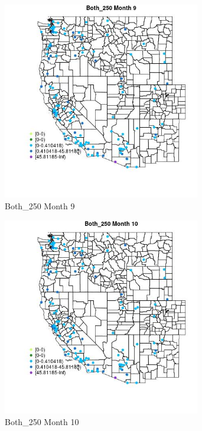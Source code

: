 \begin{figure} 
\centering  
\includegraphics[width=0.77\textwidth]{Code_Outputs/Report_ML_input_PM25_Step4_part_e_de_duplicated_aves_MapObsMo9Both_250.jpg} 
\caption{\label{fig:Report_ML_input_PM25_Step4_part_e_de_duplicated_avesMapObsMo9Both_250}Both_250 Month 9} 
\end{figure} 
 

\begin{figure} 
\centering  
\includegraphics[width=0.77\textwidth]{Code_Outputs/Report_ML_input_PM25_Step4_part_e_de_duplicated_aves_MapObsMo10Both_250.jpg} 
\caption{\label{fig:Report_ML_input_PM25_Step4_part_e_de_duplicated_avesMapObsMo10Both_250}Both_250 Month 10} 
\end{figure} 
 

